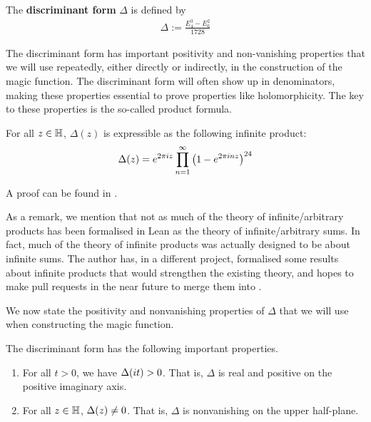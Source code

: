 \begin{boxdefinition}\label{Ch2:Def:DiscForm}
    The \textbf{discriminant form} $\Delta$ is defined by
    \begin{align}
        \Delta := \frac{E_4^3 - E_6^2}{1728}
        \label{Ch2:Eq:DiscForm_def}
    \end{align}
\end{boxdefinition}

The discriminant form has important positivity and non-vanishing properties that we will use repeatedly, either directly or indirectly, in the construction of the magic function. The discriminant form will often show up in denominators, making these properties essential to prove properties like holomorphicity. The key to these properties is the so-called product formula.

\begin{boxtheorem}
    For all $z \in \mathbb{H}$, $\Delta(z)$ is expressible as the following infinite product:
    \begin{align}
        \Delta(z) = e^{2 \pi i z} \prod_{n=1}^{\infty} \left( 1 - e^{2 \pi i n z} \right)^{24}
    \end{align}
\end{boxtheorem}


A proof can be found in \cite[Chapter VII, §4, Theorem 6, p. 95]{SerreArith}.

As a remark, we mention that not as much of the theory of infinite/arbitrary products has been formalised in Lean as the theory of infinite/arbitrary sums. In fact, much of the theory of infinite products was actually designed to be about infinite sums. The author has, in a different project, formalised some results about infinite products that would strengthen the existing theory, and hopes to make pull requests in the near future to merge them into \mathlib.


We now state the positivity and nonvanishing properties of $\Delta$ that we will use when constructing the magic function.

\begin{boxcorollary}
    The discriminant form has the following important properties.
    \begin{enumerate}
        \item For all $t > 0$, we have $\Delta\!\left( it \right) > 0$. That is, $\Delta$ is real and positive on the positive imaginary axis.
        \item For all $z \in \mathbb{H}$, $\Delta\!\left( z \right) \neq 0$. That is, $\Delta$ is nonvanishing on the upper half-plane.
    \end{enumerate}
\end{boxcorollary}

